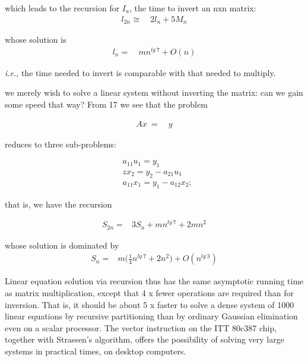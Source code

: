 which leads to the recursion for $I_{a}$, the time to invert an nxn matrix:
\begin{align}
l_{2n} \cong&\ 2l_{n} + 5M_{n}
\end{align} 

whose solution is
\begin{align}
l_{n} =&\ mn^{lg\ 7} + O(n)
\end{align}

\textit{i.e.}, the time needed to invert is comparable with that needed to multiply.

 we merely wish to solve a linear system without inverting the matrix: can we gain some speed that way? From 17 we
see that the problem

\begin{align*}
Ax\ =&\ y
\end{align*}

reduces to three sub-problems:

\begin{subequations}
\begin{align}
   & a_{11}u_{1} = y_{1}                 \\
   & zx_{2} = y_{2} - a_{21}{u}_1   \\
   & a_{11}x_{1} = y_{1} - a_{12}x_{2};
\end{align}
\end{subequations}

that is, we have the recursion

\begin{align}
S_{2n} =& 3S_{n} + mn^{lg\ 7} + 2mn^{2}
\end{align}

whose solution is dominated by
\begin{align}
S_{n} =& m\bigg(\frac{1}{4}n^{lg\ 7} + 2n^{2}\bigg) + O(n^{lg\ 3})
\end{align}

Linear equation solution via recursion thus has the same asymptotic running time as matrix multiplication, except that 4 x fewer operations are required than for inversion. That is, it should be about 5 x faster to solve a dense system of 1000 linear equations by recursive partitioning than by ordinary Gaussian elimination even on a scalar processor. The vector instruction on the ITT 80c387 chip, together with Strassen's algorithm, offers the possibility of solving very large systems in practical times, on desktop computers.
